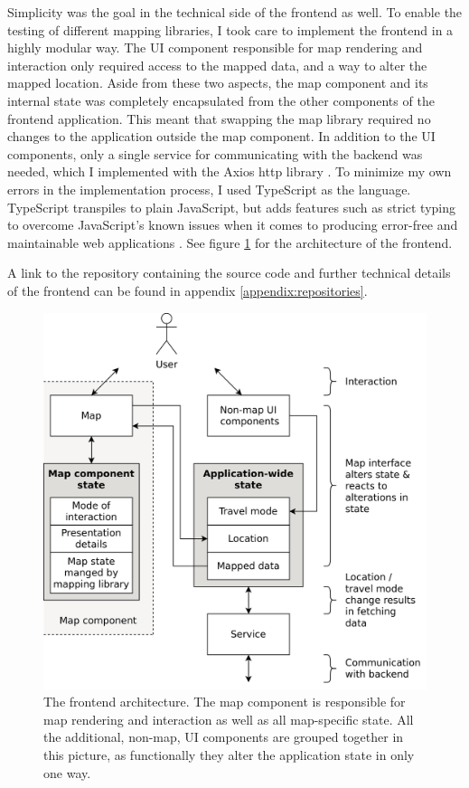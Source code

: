 Simplicity was the goal in the technical side of the frontend as well.
To enable the testing of different mapping libraries,
I took care to implement the frontend in a highly modular way.
The UI component responsible for map rendering and interaction
only required access to the mapped data,
and a way to alter the mapped location.
Aside from these two aspects,
the map component and its internal state was completely encapsulated
from the other components of the frontend application.
This meant that swapping the map library
required no changes to the application outside the map component.
In addition to the UI components,
only a single service for communicating with the backend was needed,
which I implemented with the Axios \acrshort{http} library \parencite{axios}.
To minimize my own errors in the implementation process,
I used TypeScript \parencite{typescript} as the language.
TypeScript transpiles to plain JavaScript,
but adds features such as strict typing to overcome JavaScript's known issues
when it comes to producing error-free and maintainable web applications \parencite{bie2014}.
See figure \ref{fig:frontend architecture} for the architecture of the frontend.

A link to the repository containing the source code
and further technical details of the frontend
can be found in appendix \ref{appendix:repositories}.

\begin{figure}[H]  %
	\centering
	\includegraphics[width=\diagramwidth]{visual/figures/diagrams/frontend.png}
	\caption{
		The frontend architecture.
		The map component is responsible for map rendering and interaction
		as well as all map-specific state.
		All the additional, non-map, UI components are grouped together in this picture,
		as functionally they alter the application state in only one way.
	}
	\label{fig:frontend architecture}
\end{figure}


